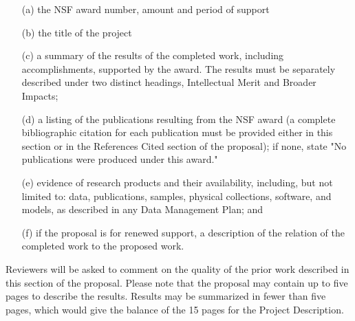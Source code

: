 \begin{itemize}
\item[(a)] the NSF award number, amount and period of support

\item[(b)] the title of the project

\item[(c)] a summary of the results of the completed work, including
  accomplishments, supported by the award. The results must be
  separately described under two distinct headings, Intellectual Merit
  and Broader Impacts;

\item[(d)] a listing of the publications resulting from the NSF award
  (a complete bibliographic citation for each publication must be
  provided either in this section or in the References Cited section
  of the proposal); if none, state "No publications were produced
  under this award."

\item[(e)] evidence of research products and their availability,
  including, but not limited to: data, publications, samples, physical
  collections, software, and models, as described in any Data
  Management Plan; and

\item[(f)] if the proposal is for renewed support, a description of
  the relation of the completed work to the proposed work.
\end{itemize}

Reviewers will be asked to comment on the quality of the prior work
described in this section of the proposal. Please note that the
proposal may contain up to five pages to describe the results. Results
may be summarized in fewer than five pages, which would give the
balance of the 15 pages for the Project Description.
